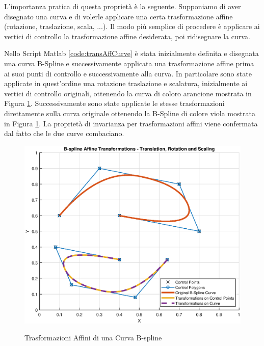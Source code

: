 \documentclass[a4paper, 12pt]{article}
\begin{document}
L'importanza pratica di questa proprietà è la seguente. Supponiamo di aver disegnato una curva e di volerle applicare una certa trasformazione affine (rotazione,
traslazione, scala, ...). Il modo più semplice di procedere è applicare ai vertici di controllo la trasformazione affine desiderata, poi ridisegnare la curva.



Nello Script Matlab \ref{code:transAffCurve} è stata inizialmente definita e disegnata una curva B-Spline e successivamente applicata una trasformazione affine prima ai suoi punti di controllo e successivamente alla curva. In particolare sono state applicate in quest'ordine una rotazione traslazione e scalatura, inizialmente ai vertici di controllo originali, ottenendo la curva di coloro arancione mostrata in Figura \ref{fig:transAffCurve}. Successivamente sono state applicate le stesse trasformazioni direttamente sulla curva originale ottenendo la B-Spline di colore viola mostrata in Figura \ref{fig:transAffCurve}. La proprietà di invarianza per trasformazioni affini viene confermata dal fatto che le due curve combaciano.

\begin{figure}[!]
	\centering
	\caption{Trasformazioni Affini di una Curva B-spline}
	\includegraphics[scale=0.7]{curve_affine_trans_plot.eps}
	\label{fig:transAffCurve}
\end{figure}
\end{document}
